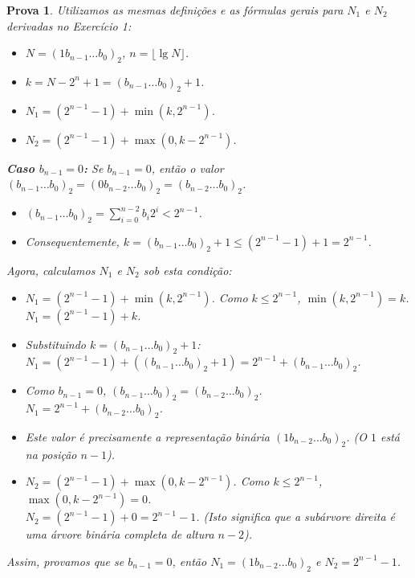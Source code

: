 \documentclass[11pt,reqno,a4paper]{amsart}
\theoremstyle{prova_style}
\newtheorem*{prova}{Prova} %
\DeclareMathOperator{\lgop}{lg}
\newcommand{\lgfn}[1]{\lgop #1}
\begin{document}
\begin{prova}
Utilizamos as mesmas definições e as fórmulas gerais para $N_1$ e $N_2$ derivadas no Exercício 1:
\begin{itemize}
    \item $N = (1 b_{n-1} \dots b_0)_2$, $n = \lfloor \lgfn N \rfloor$.
    \item $k = N - 2^n + 1 = (b_{n-1} \dots b_0)_2 + 1$.
    \item $N_1 = (2^{n-1} - 1) + \min(k, 2^{n-1})$.
    \item $N_2 = (2^{n-1} - 1) + \max(0, k - 2^{n-1})$.
\end{itemize}

\textbf{Caso $b_{n-1}=0$:}
Se $b_{n-1}=0$, então o valor $(b_{n-1} \dots b_0)_2 = (0 b_{n-2} \dots b_0)_2 = (b_{n-2} \dots b_0)_2$.
\begin{itemize}
    \item $(b_{n-1} \dots b_0)_2 = \sum_{i=0}^{n-2} b_i 2^i < 2^{n-1}$.
    \item Consequentemente, $k = (b_{n-1} \dots b_0)_2 + 1 \leq (2^{n-1} - 1) + 1 = 2^{n-1}$.
\end{itemize}
Agora, calculamos $N_1$ e $N_2$ sob esta condição:
\begin{itemize}
    \item $N_1 = (2^{n-1} - 1) + \min(k, 2^{n-1})$. Como $k \leq 2^{n-1}$, $\min(k, 2^{n-1}) = k$. \\
          $N_1 = (2^{n-1} - 1) + k$.
    \item Substituindo $k = (b_{n-1} \dots b_0)_2 + 1$: \\
          $N_1 = (2^{n-1} - 1) + ((b_{n-1} \dots b_0)_2 + 1) = 2^{n-1} + (b_{n-1} \dots b_0)_2$.
    \item Como $b_{n-1}=0$, $(b_{n-1} \dots b_0)_2 = (b_{n-2} \dots b_0)_2$. \\
          $N_1 = 2^{n-1} + (b_{n-2} \dots b_0)_2$.
    \item Este valor é precisamente a representação binária $\boxed{(1 b_{n-2} \dots b_0)_2}$. (O $1$ está na posição $n-1$).
    \item $N_2 = (2^{n-1} - 1) + \max(0, k - 2^{n-1})$. Como $k \leq 2^{n-1}$, $\max(0, k - 2^{n-1}) = 0$. \\
          $N_2 = (2^{n-1} - 1) + 0 = \boxed{2^{n-1} - 1}$.
          (Isto significa que a subárvore direita é uma árvore binária completa de altura $n-2$).
\end{itemize}
Assim, provamos que se $b_{n-1}=0$, então $N_1 = (1 b_{n-2} \dots b_0)_2$ e $N_2 = 2^{n-1} - 1$.
\end{prova}
\end{document}
